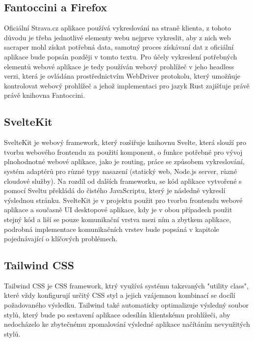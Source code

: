 \documentclass[12pt]{article}
\begin{document}
\subsection{Fantoccini a Firefox}
Oficiální Strava.cz aplikace používá vykreslování na straně klienta, z tohoto důvodu je třeba jednotlivé elementy webu nejprve vykreslit, aby z nich web sacraper mohl získat potřebná data, samotný proces získávaní dat z oficiální aplikace bude popsán později v tomto textu. Pro účely vykreslení potřebných elementů webové aplikace je tedy používán webový prohlížeč v jeho headless verzi, která je ovládána prostřednictvím WebDriver protokolu, který umožňuje kontrolovat webový prohlížeč\cite{webdriver} a jehož implementaci pro jazyk Rust zajišťuje právě právě knihovna Fantoccini\cite{fantoccini}.
\subsection{SvelteKit}
SvelteKit je webový framework, který rozšiřuje knihovnu Svelte, která slouží pro tvorbu webového frontendu za použití komponent, o funkce potřebné pro vývoj plnohodnotné webové aplikace, jako je routing, práce se způsobem vykreslování, systém adaptérů pro různé typy nasazení (statický web, Node.js server, různé cloudové služby)\cite{adapters}. Na rozdíl od dalších frameworku, se kód aplikace vytvořené s pomocí Sveltu překládá do čistého JavaScriptu, který je následně vykreslí výslednou stránku\cite{sveltekit}. SvelteKit je v projektu použit pro tvorbu frontendu webové aplikace a současně UI desktopové aplikace, kdy je v obou případech použit stejný kód a liší se pouze komunikační vrstva mezi ním a zbytkem aplikace, podrobná implementace komunikačních vrstev bude popsáná v kapitole pojednávající o klíčových problémech.
\subsection{Tailwind CSS}
Tailwind CSS je CSS framework, ktrý využívá systému takzvaných "utility class", které vždy konfigurují určitý CSS styl a jejich vzájemnou kombinací se docílí požadovaného výsledku. Tailwind také automaticky optimalizuje výsledný soubor stylů, který bude po sestavení aplikace odesílán klientskému prohlížeči, aby nedocházelo ke zbytečnému zpomalování výsledné aplikace načítáním nevyužitých stylů\cite{tailwind}.
\newpage
\end{document}
